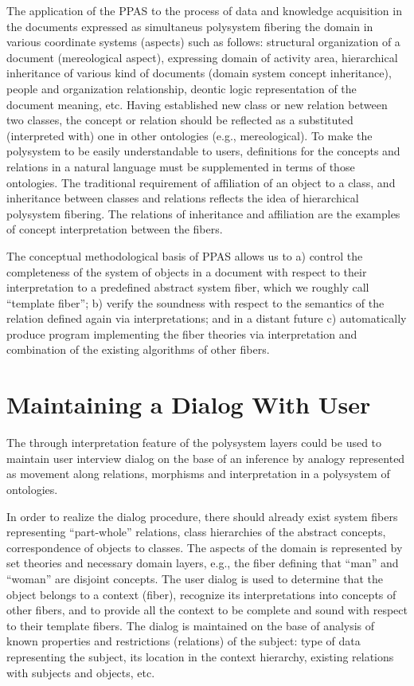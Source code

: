 \documentclass[conference]{IEEEtran}
\begin{document}
The application of the PPAS to the process of data and knowledge acquisition in the documents expressed as simultaneus polysystem fibering the domain in various coordinate systems (aspects) such as follows: structural organization of a document (mereological aspect), expressing domain of activity area, hierarchical inheritance of various kind of documents (domain system concept inheritance), people and organization relationship, deontic logic representation of the document meaning, etc.  Having established new class or new relation between two classes, the concept or relation should be reflected as a substituted (interpreted with) one in other ontologies (e.g., mereological).  To make the polysystem to be easily understandable to users, definitions for the concepts and relations in a natural language must be supplemented in terms of those ontologies.  The traditional requirement of affiliation of an object to a class, and inheritance between classes and relations reflects the idea of hierarchical polysystem fibering.  The relations of inheritance and affiliation are the examples of concept interpretation between the fibers.

The conceptual methodological basis of PPAS allows us to a) control
the completeness of the system of objects in a document with respect
to their interpretation to a predefined abstract system fiber, which
we roughly call ``template fiber''; b) verify the soundness with
respect to the semantics of the relation defined again via
interpretations; and in a distant future c) automatically produce
program implementing the fiber theories via interpretation and
combination of the existing algorithms of other fibers.

\section{Maintaining a Dialog With User}
\label{sec:maint-dial}

The through interpretation feature of the polysystem layers could be
used to maintain user interview dialog on the base of an inference by
analogy represented as movement along relations, morphisms and
interpretation in a polysystem of ontologies.

In order to realize the dialog procedure, there should already exist
system fibers representing ``part-whole'' relations, class hierarchies
of the abstract concepts, correspondence of objects to classes.  The
aspects of the domain is represented by set theories and necessary
domain layers, e.g., the fiber defining that ``man'' and ``woman'' are
disjoint concepts.  The user dialog is used to determine that the
object belongs to a context (fiber), recognize its interpretations
into concepts of other fibers, and to provide all the context to be
complete and sound with respect to their template fibers.  The dialog
is maintained on the base of analysis of known properties and
restrictions (relations) of the subject: type of data representing
the subject, its location in the context hierarchy, existing relations
with subjects and objects, etc.
\end{document}
